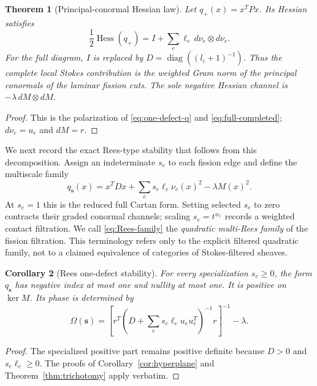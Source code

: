 \documentclass[11pt,a4paper]{amsart}
\theoremstyle{plain}
\newtheorem{theorem}{Theorem}[section]
\newtheorem{corollary}[theorem]{Corollary}
\theoremstyle{definition}
\newcommand{\diag}{\operatorname{diag}}
\begin{document}
\begin{theorem}[Principal-conormal Hessian law]\label{thm:conormal-Hessian}
Let $q_+(x)=x^TPx$.  Its Hessian satisfies
\begin{equation}\label{eq:Hessian-law}
 \frac12\operatorname{Hess}(q_+)
 =I+\sum_e\ell_e\,d\nu_e\otimes d\nu_e.
\end{equation}
For the full diagram, $I$ is replaced by
$D=\diag((l_i+1)^{-1})$.  Thus the complete local Stokes contribution is the weighted Gram norm of
the principal conormals of the laminar fission cuts.  The sole negative Hessian channel is
$-\lambda\,dM\otimes dM$.
\end{theorem}

\begin{proof}
This is the polarization of \eqref{eq:one-defect-q} and
\eqref{eq:full-completed}; $d\nu_e=u_e$ and $dM=r$.
\end{proof}

We next record the exact Rees-type stability that follows from this decomposition.  Assign an
indeterminate $s_e$ to each fission edge and define the multiscale family
\begin{equation}\label{eq:Rees-family}
 q_{\boldsymbol s}(x)=x^TDx+
   \sum_e s_e\ell_e\nu_e(x)^2-\lambda M(x)^2.
\end{equation}
At $s_e=1$ this is the reduced full Cartan form.  Setting selected $s_e$ to zero contracts their
graded conormal channels; scaling $s_e=t^{w_e}$ records a weighted contact filtration.  We call
\eqref{eq:Rees-family} the \emph{quadratic multi-Rees family} of the fission filtration.  This
terminology refers only to the explicit filtered quadratic family, not to a claimed equivalence of
categories of Stokes-filtered sheaves.

\begin{corollary}[Rees one-defect stability]\label{cor:Rees-stability}
For every specialization $s_e\ge0$, the form $q_{\boldsymbol s}$ has negative index at most one and
nullity at most one.  It is positive on $\ker M$.  Its phase is determined by
\begin{equation}\label{eq:Rees-gap}
 \Omega(\boldsymbol s)=
 \left[r^T\left(D+\sum_e s_e\ell_eu_eu_e^T\right)^{-1}r\right]^{-1}
 -\lambda.
\end{equation}
\end{corollary}

\begin{proof}
The specialized positive part remains positive definite because $D>0$ and $s_e\ell_e\ge0$.
The proofs of Corollary~\ref{cor:hyperplane} and Theorem~\ref{thm:trichotomy} apply verbatim.
\end{proof}
\end{document}
